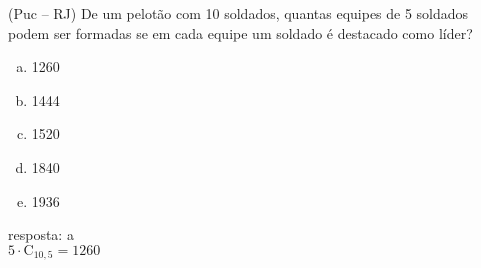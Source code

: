 \begin{ex}
(Puc – RJ) De um pelotão  com 10 soldados, quantas equipes de 5 soldados podem ser formadas se em cada equipe um soldado é destacado como líder?
   \begin{enumerate}[(a)]
   \item 1260
   \item 1444
   \item 1520
   \item 1840
   \item 1936
   \end{enumerate}
     \begin{sol}
       resposta: a \\
       $5\cdot\mathrm{C}_{{10},5}=1260$
     \end{sol}
\end{ex}